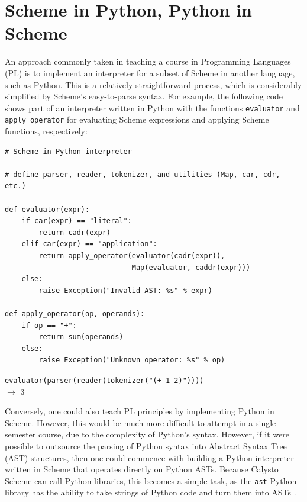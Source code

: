 \documentclass[acmsmall,screen,anonymous,review]{acmart}
\begin{document}
\section{Scheme in Python, Python in Scheme}

An approach commonly taken in teaching a course in Programming Languages (PL)
is to implement an interpreter for a subset of Scheme in another language, such
as Python. This is a relatively straightforward process, which is considerably
simplified by Scheme's easy-to-parse syntax.  For example, the following code
shows part of an interpreter written in Python with the functions
\texttt{evaluator} and \texttt{apply\_operator} for evaluating Scheme
expressions and applying Scheme functions, respectively:\\

\begin{minipage}{\textwidth}
{\small
\begin{verbatim}
# Scheme-in-Python interpreter

# define parser, reader, tokenizer, and utilities (Map, car, cdr, etc.)

def evaluator(expr):
    if car(expr) == "literal":
        return cadr(expr)
    elif car(expr) == "application":
        return apply_operator(evaluator(cadr(expr)),
                              Map(evaluator, caddr(expr)))
    else:
        raise Exception("Invalid AST: %s" % expr)

def apply_operator(op, operands):
    if op == "+":
        return sum(operands)
    else:
        raise Exception("Unknown operator: %s" % op)

\end{verbatim}
\texttt{evaluator(parser(reader(tokenizer("(+ 1 2)"))))}\\
$\rightarrow$ 3\\
}
\end{minipage}

\noindent
Conversely, one could also teach PL principles by implementing Python in
Scheme. However, this would be much more difficult to attempt in a single
semester course, due to the complexity of Python's syntax. However, if it were
possible to outsource the parsing of Python syntax into Abstract Syntax Tree
(AST) structures, then one could commence with building a Python interpreter
written in Scheme that operates directly on Python ASTs. Because Calysto Scheme
can call Python libraries, this becomes a simple task, as the \texttt{ast}
Python library has the ability to take strings of Python code and turn them
into ASTs \cite{PythonInScheme}.
\end{document}
